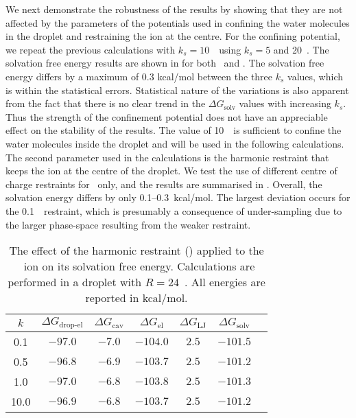 We next demonstrate the robustness of the results by showing that they are not affected by the 
parameters of the potentials used in confining the water molecules in the droplet and restraining 
the ion at the centre. For the confining potential, we repeat the previous calculations with 
$k_{s}=10$~\spring\ using $k_{s}=5$ and 20~\spring. The solvation free energy results are shown in 
 for both \Na\ and \Cl. The solvation free energy differs by a maximum of 
0.3 kcal/mol between the three $k_{s}$ values, which is within the statistical errors. Statistical 
nature of the variations is also apparent from the fact that there is no clear trend in the $\Delta 
G_{\text{solv}}$ values with increasing $k_{s}$. Thus the strength of the confinement potential does 
not have an appreciable effect on the stability of the results. The value of 10~\spring\ is sufficient 
to confine the water molecules inside the droplet and will be used in the following calculations. 
The second parameter used in the calculations is the harmonic restraint that keeps the ion at the 
centre of the droplet. We test the use of different centre of charge restraints for \Na\ only, and 
the results are summarised in . Overall, the solvation energy differs by only 
0.1--0.3~kcal/mol. The largest deviation occurs for the 0.1~\spring\ restraint, which is presumably 
a consequence of under-sampling due to the larger phase-space resulting from the weaker restraint.

\begin{table}[t!]
\caption{\label{solv:tab3} The effect of the harmonic restraint (\spring) applied 
to the \Na\ ion on its solvation free energy. Calculations are performed in 
a droplet with $R=24$~\angs. All energies are reported in kcal/mol.}
\centering
\begin{tabular}{ccccccc}
\hline
$k$ & $\Delta G_{\text{drop-el}}$ & $\Delta G_{\text{cav}}$ & $\Delta 
G_{\text{el}}$ & $\Delta G_{\text{LJ}}$ & $\Delta G_{\text{solv}}$ \\ \hline
 0.1 & $-97.0$ & $-7.0$ & $-104.0$ & $2.5$ & $-101.5$ \\ 
 0.5 & $-96.8$ & $-6.9$ & $-103.7$ & $2.5$ & $-101.2$ \\ 
 1.0 & $-97.0$ & $-6.8$ & $-103.8$ & $2.5$ & $-101.3$ \\
10.0 & $-96.9$ & $-6.8$ & $-103.7$ & $2.5$ & $-101.2$ \\ \hline
\end{tabular}
\end{table}

